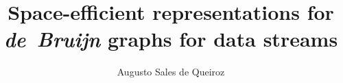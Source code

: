 \documentclass[bsc]{ufpethesis}
\institute{Centro de Informatica}
\author{Augusto Sales de Queiroz}
\title{Space-efficient representations for \emph{de~Bruijn} graphs for data streams}
\begin{document}
\frontmatter
    \frontpage
    \presentationpage
\end{document}
